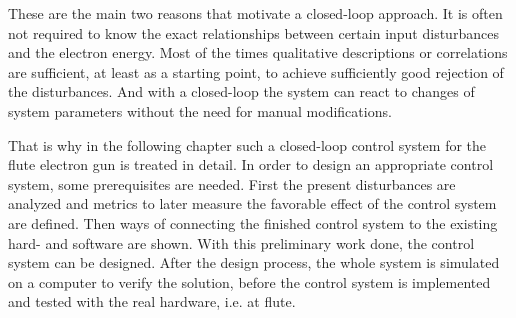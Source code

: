 These are the main two reasons that motivate a closed-loop approach. It is often not required to know the exact relationships between certain input disturbances and the electron energy. Most of the times qualitative descriptions or correlations are sufficient, at least as a starting point, to achieve sufficiently good rejection of the disturbances. And with a closed-loop the system can react to changes of system parameters without the need for manual modifications.

That is why in the following chapter such a closed-loop control system for the \gls{flute} electron gun is treated in detail. In order to design an appropriate control system, some prerequisites are needed. First the present disturbances are analyzed and metrics to later measure the favorable effect of the control system are defined. Then ways of connecting the finished control system to the existing hard- and software are shown. With this preliminary work done, the control system can be designed. After the design process, the whole system is simulated on a computer to verify the solution, before the control system is implemented and tested with the real hardware, i.e. at \gls{flute}.


